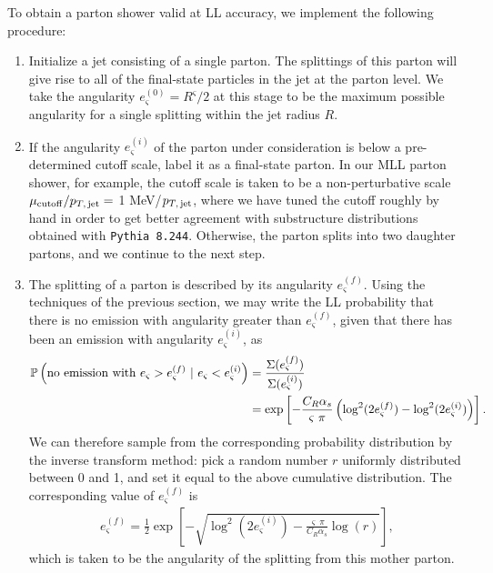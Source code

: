 \documentclass[letterpaper,11pt]{article}
\begin{document}
To obtain a parton shower valid at LL accuracy, we implement the following procedure:
\begin{enumerate}
    \item
    \label{item:LL_ps_start}
    Initialize a jet consisting of a single parton.
    The splittings of this parton will give rise to all of the final-state particles in the jet at the parton level.
    We take the angularity \(e^{(0)}_\varsigma = R^\varsigma / 2\) at this stage to be the maximum possible angularity for a single splitting within the jet radius \(R\).

    \item
    \label{item:cutoff}
    If the angularity \(e^{(i)}_\varsigma\) of the parton under consideration is below a pre-determined cutoff scale, label it as a final-state parton.
    In our MLL parton shower, for example, the cutoff scale is taken to be a non-perturbative scale \(\mu_{\rm cutoff}/ p_{T,\,{\rm jet}} = \) 1 MeV/\(p_{T,\,{\rm jet}}\), where we have tuned the cutoff roughly by hand in order to get better agreement with substructure distributions obtained with \texttt{Pythia 8.244}.
    Otherwise, the parton splits into two daughter partons, and we continue to the next step.

    \item
    \label{item:LL_angularity_gen}
    The splitting of a parton is described by its angularity \(e^{(f)}_\varsigma\).
    Using the techniques of the previous section, we may write the LL probability that there is no emission with angularity greater than \(e^{(f)}_\varsigma\), given that there has been an emission with angularity \(e^{(i)}_\varsigma\), as
    \begin{align}
        \label{eqn:alg_LLang_ratio}
        \mathbb{P}
        \left(
            {\rm no~emission~with~}e_\varsigma>e^{(f)}_\varsigma
            ~|~
            e_\varsigma < e^{(i)}_\varsigma
        \right)
        &=
        \frac{\Sigma(e^{(f)}_\varsigma)}{\Sigma(e^{(i)}_\varsigma)}
        \\
        \notag
        &=
        \exp\left[
            -\frac{C_R \alpha_s}{\varsigma~\pi}
            \left(
                \log^2(2 e^{(f)}_\varsigma) - \log^2(2 e^{(i)}_\varsigma)
            \right)
        \right]
        .
    \end{align}
    We can therefore sample from the corresponding probability distribution by the inverse transform method:
    pick a random number \(r\) uniformly distributed between 0 and 1, and set it equal to the above cumulative distribution.
    The corresponding value of \(e^{(f)}_\varsigma\) is
    \begin{align}
        \label{eqn:alg_LLang}
        e^{(f)}_\varsigma
        =
        \frac{1}{2}
        \exp\left[
            -\sqrt{\log^2(2 e^{(i)}_\varsigma) - \frac{\varsigma~\pi}{C_R \alpha_s} \log(r)}
        \right]
        ,
    \end{align}
    which is taken to be the angularity of the splitting from this mother parton.


\end{enumerate}
\end{document}
